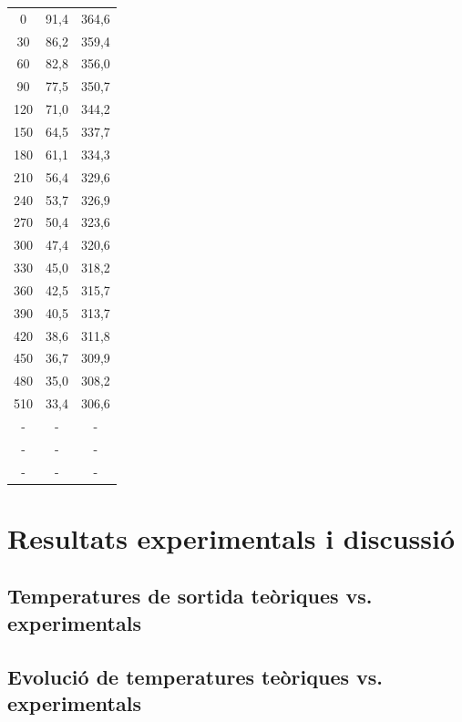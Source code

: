 \documentclass[10pt, twoside]{article}
\begin{document}
\begin{table}[H]
\begin{minipage}{0.3\textwidth}
\begin{tabular}{ccc}
            \midrule
            0   & 91,4 & 364,6 \\
            30  & 86,2 & 359,4 \\
            60  & 82,8 & 356,0 \\
            90  & 77,5 & 350,7 \\
            120 & 71,0 & 344,2 \\
            150 & 64,5 & 337,7 \\
            180 & 61,1 & 334,3 \\
            210 & 56,4 & 329,6 \\
            240 & 53,7 & 326,9 \\
            270 & 50,4 & 323,6 \\
            300 & 47,4 & 320,6 \\
            330 & 45,0 & 318,2 \\
            360 & 42,5 & 315,7 \\
            390 & 40,5 & 313,7 \\
            420 & 38,6 & 311,8 \\
            450 & 36,7 & 309,9 \\
            480 & 35,0 & 308,2 \\
            510 & 33,4 & 306,6 \\
            - & - & - \\
            - & - & - \\
            - & - & - \\
            \bottomrule
        \end{tabular}
        
        \label{tabla:muestra3}
    \end{minipage}
\end{table}


\section{Resultats experimentals i discussió}

\subsection{Temperatures de sortida teòriques vs. experimentals}

\subsection{Evolució de temperatures teòriques vs. experimentals}
\end{document}
